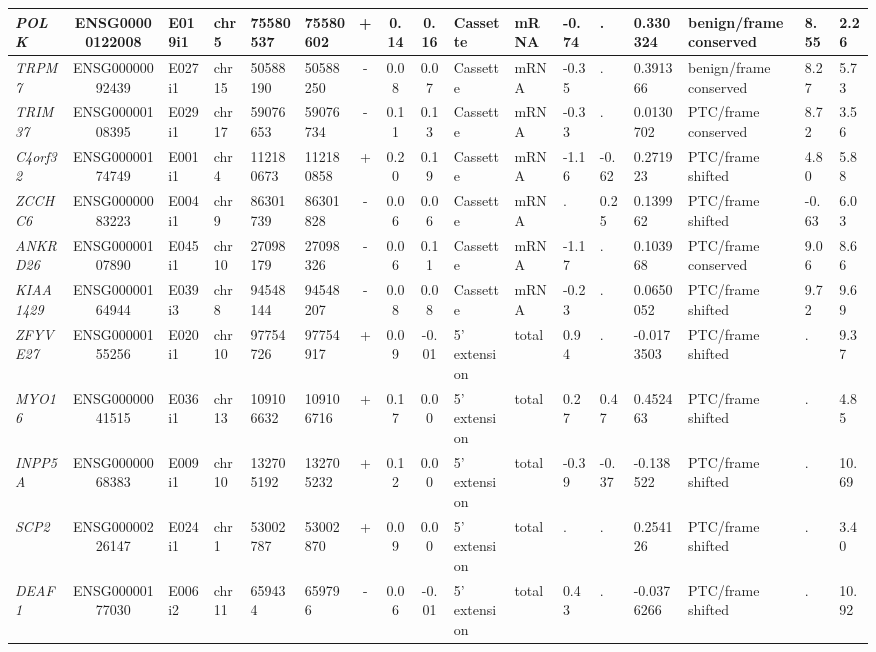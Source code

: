\begin{appendices}
\begin{landscape}
\begin{table}
{\begin{tabular}{|l|c|l|l|l|l|c|c|c|l|l|l|l|l|l|l|l|}
		\textit{POLK} & ENSG00000122008 & E019i1 & chr5  & 75580537 & 75580602 & +     & 0.14  & 0.16  & Cassette & mRNA  & -0.74 & . & 0.330324 & benign/frame conserved & 8.55  &  2.26 \\ \hline
		\textit{TRPM7} & ENSG00000092439 & E027i1 & chr15 & 50588190 & 50588250 & -     & 0.08  & 0.07  & Cassette & mRNA  & -0.35 & . & 0.391366 & benign/frame conserved & 8.27  &  5.73 \\ \hline
		\textit{TRIM37} & ENSG00000108395 & E029i1 & chr17 & 59076653 & 59076734 & -     & 0.11  & 0.13  & Cassette & mRNA  & -0.33 & . & 0.0130702 & PTC/frame conserved & 8.72  &  3.56 \\ \hline
		\textit{C4orf32} & ENSG00000174749 & E001i1 & chr4  & 112180673 & 112180858 & +     & 0.20  & 0.19  & Cassette & mRNA  & -1.16 & -0.62 & 0.271923 & PTC/frame shifted & 4.80  &  5.88 \\ \hline
		\textit{ZCCHC6} & ENSG00000083223 & E004i1 & chr9  & 86301739 & 86301828 & -     & 0.06  & 0.06  & Cassette & mRNA  & . & 0.25  & 0.139962 & PTC/frame shifted & -0.63 &  6.03 \\ \hline
		\textit{ANKRD26} & ENSG00000107890 & E045i1 & chr10 & 27098179 & 27098326 & -     & 0.06  & 0.11  & Cassette & mRNA  & -1.17 & . & 0.103968 & PTC/frame conserved & 9.06  &  8.66 \\ \hline
		\textit{KIAA1429} & ENSG00000164944 & E039i3 & chr8  & 94548144 & 94548207 & -     & 0.08  & 0.08  & Cassette & mRNA  & -0.23 & . & 0.0650052 & PTC/frame shifted & 9.72  &  9.69 \\ \hline
		\textit{ZFYVE27} & ENSG00000155256 & E020i1 & chr10 & 97754726 & 97754917 & +     & 0.09  & -0.01 & 5' extension & total & 0.94  & . & -0.0173503 & PTC/frame shifted & . &  9.37 \\ \hline
		\textit{MYO16} & ENSG00000041515 & E036i1 & chr13 & 109106632 & 109106716 & +     & 0.17  & 0.00  & 5' extension & total & 0.27  & 0.47  & 0.452463 & PTC/frame shifted & . &  4.85 \\ \hline
		\textit{INPP5A} & ENSG00000068383 & E009i1 & chr10 & 132705192 & 132705232 & +     & 0.12  & 0.00  & 5' extension & total & -0.39 & -0.37 & -0.138522 & PTC/frame shifted & . &  10.69 \\ \hline
		\textit{SCP2} & ENSG00000226147 & E024i1 & chr1  & 53002787 & 53002870 & +     & 0.09  & 0.00  & 5' extension & total & . & . & 0.254126 & PTC/frame shifted & . &  3.40 \\ \hline
		\textit{DEAF1} & ENSG00000177030 & E006i2 & chr11 & 659434 & 659796 & -     & 0.06  & -0.01 & 5' extension & total & 0.43  & . & -0.0376266 & PTC/frame shifted & . &  10.92 \\ \hline

\end{tabular}}
\end{table}
\end{landscape}
\end{appendices}
